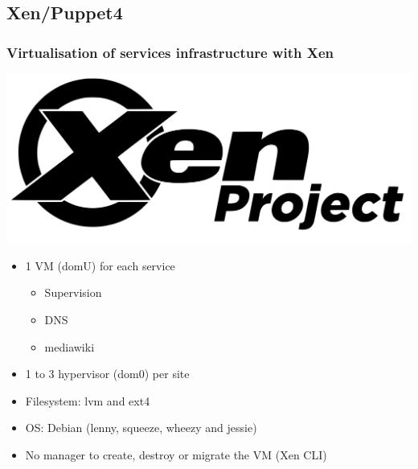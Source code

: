 \documentclass[11pt,compress,final]{beamer}
\begin{document}
\subsection{Xen/Puppet4}
\begin{frame}
\frametitle{Virtualisation of services infrastructure with Xen}
\begin{center}
\includegraphics[scale=0.04]{figures/xen}
\end{center}
\begin{itemize}
\item 1 VM (domU) for each service
\begin{itemize}
\item Supervision
\item DNS
\item mediawiki
\end{itemize}
\item 1 to 3 hypervisor (dom0) per site
\item Filesystem: lvm and ext4
\item OS: Debian (lenny, squeeze, wheezy and jessie)
\item No manager to create, destroy or migrate the VM (Xen CLI) 
\end{itemize}
\end{frame}
\end{document}
